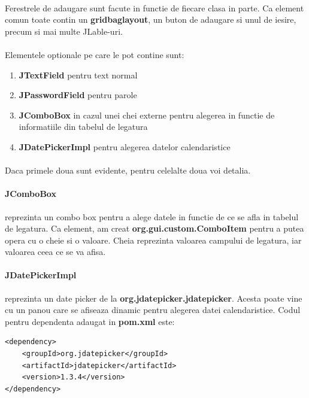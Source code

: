 \documentclass[oneside]{article}
\begin{document}
\paragraph{} Ferestrele de adaugare sunt facute in functie de fiecare clasa in parte. Ca element comun toate contin un \textbf{gridbaglayout}, un buton de adaugare si unul de iesire, precum si mai multe JLable-uri.

\paragraph{} Elementele optionale pe care le pot contine sunt:
\begin{enumerate}
    \item \textbf{JTextField} pentru text normal
    \item \textbf{JPasswordField} pentru parole
    \item \textbf{JComboBox} in cazul unei chei externe pentru alegerea in functie de informatiile din tabelul de legatura
    \item \textbf{JDatePickerImpl} pentru alegerea datelor calendaristice
\end{enumerate}

\paragraph{} Daca primele doua sunt evidente, pentru celelalte doua voi detalia.

\paragraph{JComboBox} reprezinta un combo box pentru a alege datele in functie de ce se afla in tabelul de legatura. Ca element, am creat \textbf{org.gui.custom.ComboItem} pentru a putea opera cu o cheie si o valoare. Cheia reprezinta valoarea campului de legatura, iar valoarea ceea ce se va afisa.

\paragraph{JDatePickerImpl} reprezinta un date picker de la \textbf{org.jdatepicker.jdatepicker}. Acesta poate vine cu un panou care se afiseaza dinamic pentru alegerea datei calendaristice. Codul pentru dependenta adaugat in \textbf{pom.xml} este:
\begin{center}
    \begin{lstlisting}[language=pom]
<dependency>
    <groupId>org.jdatepicker</groupId>
    <artifactId>jdatepicker</artifactId>
    <version>1.3.4</version>
</dependency>
    \end{lstlisting}
\end{center}
\end{document}
